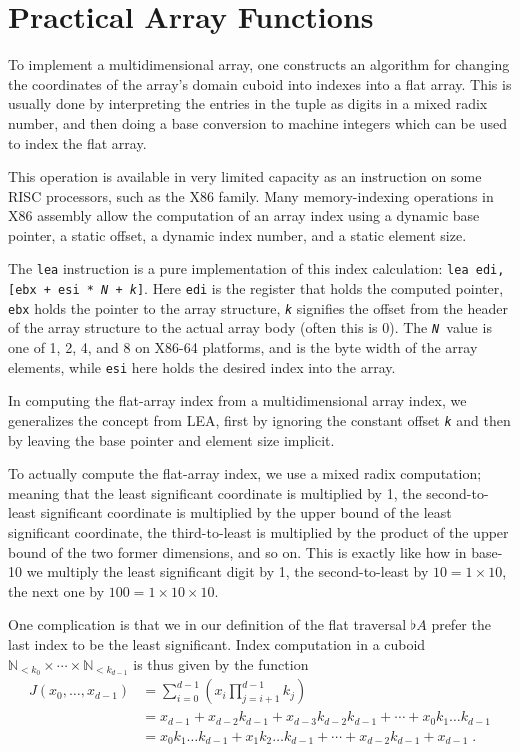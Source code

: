 \documentclass{DIKU-report-variant}
\newcommand\Nat{\mathbb{N}}
\begin{document}
\section{Practical Array Functions}

To implement a multidimensional array, one constructs an algorithm for changing the coordinates
of the array's domain cuboid into indexes into a flat array. This is usually done by interpreting
the entries in the tuple as digits in a mixed radix number, and then doing a base conversion to
machine integers which can be used to index the flat array.

This operation is available in very limited capacity as an instruction on some RISC processors,
such as the X86 family. Many memory-indexing operations in X86 assembly allow the computation of
an array index using a dynamic base pointer, a static offset, a dynamic index number, and a static
element size.

The \texttt{lea} instruction is a pure implementation of this index calculation:
\texttt{lea edi, [ebx + esi * \textit N + \textit k]}. Here \texttt{edi} is the register
that holds the computed pointer, \texttt{ebx} holds the pointer to the array structure,
\texttt{\textit k} signifies the offset from the header of the array structure to the actual
array body (often this is 0). The \texttt{\textit N }value
is one of 1, 2, 4, and 8 on X86-64 platforms, and is the byte width of the array elements, while
\texttt{esi} here holds the desired index into the array.

In computing the flat-array index from a multidimensional array index, we generalizes the concept from LEA,
first by ignoring the constant offset \texttt{\textit k} and then by leaving the base pointer and
element size implicit. 

To actually compute the flat-array index, we use a mixed radix computation; meaning that the least
significant coordinate is multiplied by 1, the second-to-least significant coordinate is multiplied
by the upper bound of the least significant coordinate, the third-to-least is multiplied by the product
of the upper bound of the two former dimensions, and so on. This is exactly like how in base-10 we multiply
the least significant digit by 1, the second-to-least by \(10 = 1\times 10\), the next one by
\(100 = 1\times 10\times 10\). 

One complication is that we in our definition of the flat traversal \(\flat A\) prefer the last index
to be the least significant. Index computation in a cuboid \(\Nat_{<k_0} \times \cdots \times \Nat_{<k_{d-1}}\) is
thus given by the function
\begin{align*}
  J(x_0, \dots, x_{d-1}) &= \sum_{i=0}^{d-1} \left( x_i \prod_{j=i+1}^{d-1} k_j \right) \\
  &= x_{d-1} + x_{d-2} k_{d-1} + x_{d-3} k_{d-2} k_{d-1} + \cdots + x_0 k_1 \dots k_{d-1} \\
  &= x_0 k_1 \dots k_{d-1} + x_1 k_2 \dots k_{d-1} + \cdots + x_{d-2} k_{d-1} + x_{d-1} \;.
\end{align*}
\end{document}
